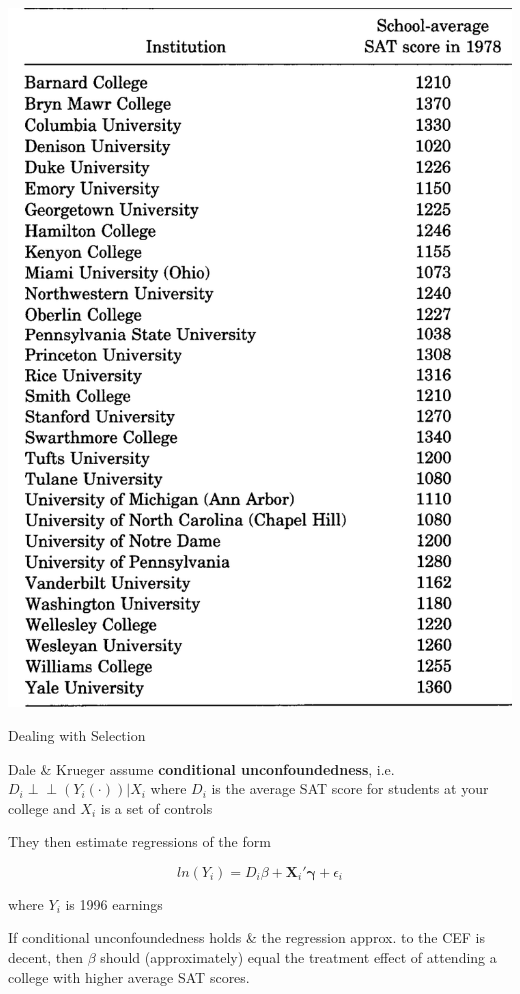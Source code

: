 \documentclass[11pt,english,handout]{beamer}
\newenvironment{wideitemize}{\itemize\addtolength{\itemsep}{10pt}}{\enditemize}
\newcommand{\indep}{\perp\!\!\!\!\perp}
\begin{document}
\begin{frame}
\centering	
\includegraphics[width = 0.5\linewidth]{dk-list-of-schools}
\end{frame}

\begin{frame}{Dealing with Selection}
	\begin{wideitemize}
		\item
		Dale \& Krueger assume \textbf{conditional unconfoundedness}, i.e. $D_i \indep (Y_i(\cdot)) | X_i$ where $D_i$ is the average SAT score for students at your college and $X_i$ is a set of controls
		
		\pause
		\item
		They then estimate regressions of the form 
		
		$$ln(Y_i) = D_i \beta + \bm{X}_i'\bm{ \gamma }+ \epsilon_i$$
		
		\noindent where $Y_i$ is 1996 earnings
		
		\pause
		\item
		If conditional unconfoundedness holds \& the regression approx. to the CEF is decent, then $\beta$ should (approximately) equal the treatment effect of attending a college with higher average SAT scores.
	\end{wideitemize}
\end{frame}
\end{document}

